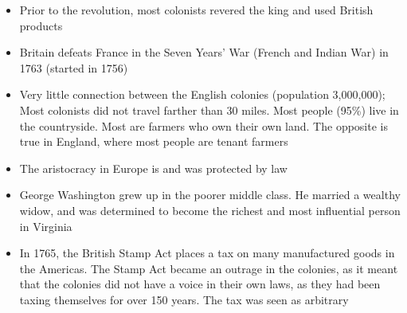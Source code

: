 \documentclass[12pt]{article}
\begin{document}
\begin{itemize}
  \item Prior to the revolution, most colonists revered the king and used British products

  \item Britain defeats France in the Seven Years' War (French and Indian War) in 1763 (started in 1756)

  \item Very little connection between the English colonies (population 3,000,000); Most colonists did not travel farther than 30 miles. Most people (95\%) live in the countryside. Most are farmers who own their own land. The opposite is true in England, where most people are tenant farmers

  \item The aristocracy in Europe is and was protected by law

  \item George Washington grew up in the poorer middle class. He married a wealthy widow, and was determined to become the richest and most influential person in Virginia

  \item In 1765, the British Stamp Act places a tax on many manufactured goods in the Americas. The Stamp Act became an outrage in the colonies, as it meant that the colonies did not have a voice in their own laws, as they had been taxing themselves for over 150 years. The tax was seen as arbitrary

\end{itemize}
\end{document}
